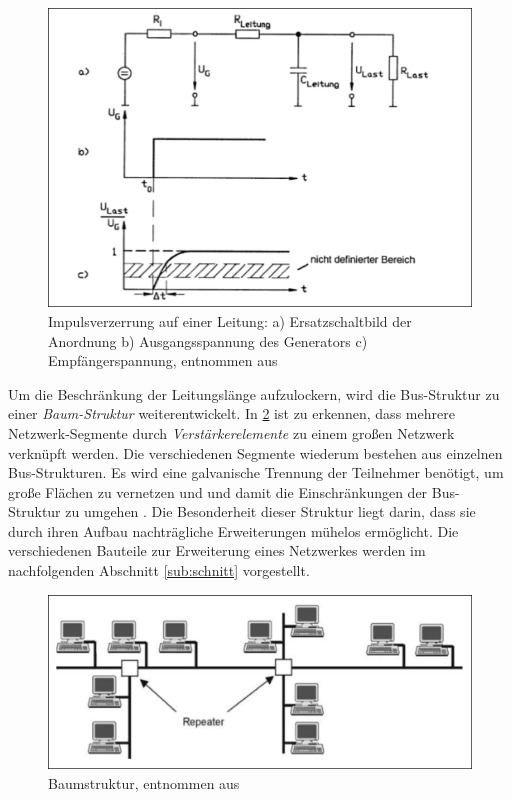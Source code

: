 \begin{figure}
\centering
\includegraphics[width=\textwidth]{abbildungen/20160110_impulsbus}
\caption[Impulsverzerrung auf einer Leitung]{Impulsverzerrung auf einer Leitung: a) Ersatzschaltbild der Anordnung b) Ausgangsspannung des Generators c) Empfängerspannung, entnommen aus \cite[S.~4]{schn06}}
\label{fig:bus_impuls}
\end{figure}

Um die Beschränkung der Leitungslänge aufzulockern, wird die Bus-Struktur zu einer \textit{Baum-Struktur} weiterentwickelt.
In \ref{fig:baum_struktur} ist zu erkennen, dass mehrere Netzwerk-Segmente durch \textit{Verstärkerelemente} zu einem großen Netzwerk verknüpft werden. Die verschiedenen Segmente wiederum bestehen aus einzelnen Bus-Strukturen.
Es wird eine galvanische Trennung der Teilnehmer benötigt, um große Flächen zu vernetzen und und damit die Einschränkungen der Bus-Struktur zu umgehen \cite[S.5~f.]{schn06}.
Die Besonderheit dieser Struktur liegt darin, dass sie durch ihren Aufbau nachträgliche Erweiterungen mühelos ermöglicht. Die verschiedenen Bauteile zur Erweiterung eines Netzwerkes werden im nachfolgenden Abschnitt \ref{sub:schnitt} vorgestellt.

\begin{figure}
\centering
\includegraphics[width=\textwidth]{abbildungen/20160110_baumstruktur}
\caption[Baumstruktur]{Baumstruktur, entnommen aus \cite[S.~5]{schn06}}
\label{fig:baum_struktur}
\end{figure}

